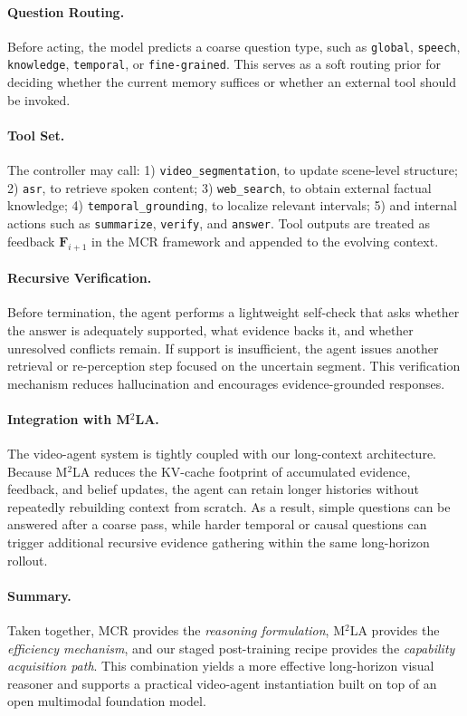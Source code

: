 \documentclass[11pt, letterpaper]{template}
\theoremstyle{plain}
\theoremstyle{definition}
\theoremstyle{remark}
\begin{document}
\paragraph{Question Routing.}
Before acting, the model predicts a coarse question type, such as \texttt{global}, \texttt{speech}, \texttt{knowledge}, \texttt{temporal}, or \texttt{fine-grained}. This serves as a soft routing prior for deciding whether the current memory suffices or whether an external tool should be invoked.

\paragraph{Tool Set.}
The controller may call: 1) \texttt{video\_segmentation}, to update scene-level structure; 2) \texttt{asr}, to retrieve spoken content; 3) \texttt{web\_search}, to obtain external factual knowledge; 4) \texttt{temporal\_grounding}, to localize relevant intervals; 5) and internal actions such as \texttt{summarize}, \texttt{verify}, and \texttt{answer}.
Tool outputs are treated as feedback $\mathbf{F}_{i+1}$ in the MCR framework and appended to the evolving context.

\paragraph{Recursive Verification.}
Before termination, the agent performs a lightweight self-check that asks whether the answer is adequately supported, what evidence backs it, and whether unresolved conflicts remain. If support is insufficient, the agent issues another retrieval or re-perception step focused on the uncertain segment. This verification mechanism reduces hallucination and encourages evidence-grounded responses.

\paragraph{Integration with M$^2$LA.}
The video-agent system is tightly coupled with our long-context architecture. Because M$^2$LA reduces the KV-cache footprint of accumulated evidence, feedback, and belief updates, the agent can retain longer histories without repeatedly rebuilding context from scratch. As a result, simple questions can be answered after a coarse pass, while harder temporal or causal questions can trigger additional recursive evidence gathering within the same long-horizon rollout.

\paragraph{Summary.}
Taken together, MCR provides the \emph{reasoning formulation}, M$^2$LA provides the \emph{efficiency mechanism}, and our staged post-training recipe provides the \emph{capability acquisition path}. This combination yields a more effective long-horizon visual reasoner and supports a practical video-agent instantiation built on top of an open multimodal foundation model.
\end{document}
